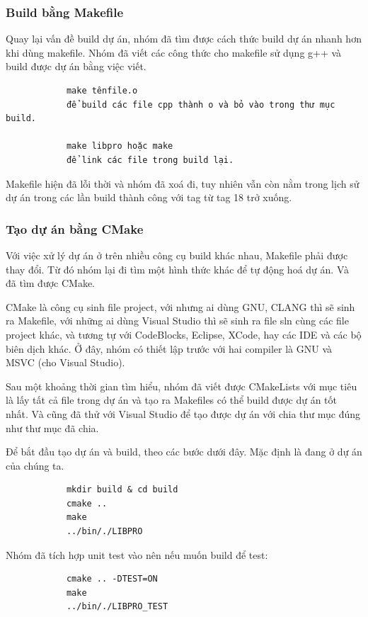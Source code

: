 \documentclass[12pt,a4paper]{report}
\begin{document}
			\subsubsection{Build bằng Makefile}

			Quay lại vấn đề build dự án, nhóm đã tìm được cách thức build dự án nhanh hơn khi dùng makefile. Nhóm đã viết các công thức cho makefile sử dụng g++ và build được dự án bằng việc viết.
			\begin{verbatim}
			make tênfile.o
			để build các file cpp thành o và bỏ vào trong thư mục build.

			make libpro hoặc make
			để link các file trong build lại.
			\end{verbatim}
			Makefile hiện đã lỗi thời và nhóm đã xoá đi, tuy nhiên vẫn còn nằm trong lịch sử dự án trong các lần build thành công với tag từ tag 18 trở xuống.

			\subsubsection{Tạo dự án bằng CMake}
			Với việc xử lý dự án ở trên nhiều công cụ build khác nhau, Makefile phải được thay đổi. Từ đó nhóm lại đi tìm một hình thức khác để tự động hoá dự án. Và đã tìm được CMake.\par
			CMake là công cụ sinh file project, với nhưng ai dùng GNU, CLANG thì sẽ sinh ra Makefile, với những ai dùng Visual Studio thì sẽ sinh ra file sln cùng các file project khác, và tương tự với CodeBlocks, Eclipse, XCode, hay các IDE và các bộ biên dịch khác. Ở đây, nhóm có thiết lập trước với hai compiler là GNU và MSVC (cho Visual Studio).\par
			Sau một khoảng thời gian tìm hiểu, nhóm đã viết được CMakeLists với mục tiêu là lấy tất cả file trong dự án và tạo ra Makefiles có thể build được dự án tốt nhất. Và cũng đã thử với Visual Studio để tạo được dự án với chia thư mục đúng như thư mục đã chia.\par

			Để bắt đầu tạo dự án và build, theo các bước dưới đây. Mặc định là đang ở dự án của chúng ta.
			\begin{verbatim}
			mkdir build & cd build
			cmake ..
			make
			../bin/./LIBPRO
			\end{verbatim}
			Nhóm đã tích hợp unit test vào nên nếu muốn build để test:
			\begin{verbatim}
			cmake .. -DTEST=ON
			make
			../bin/./LIBPRO_TEST
			\end{verbatim}
\end{document}
